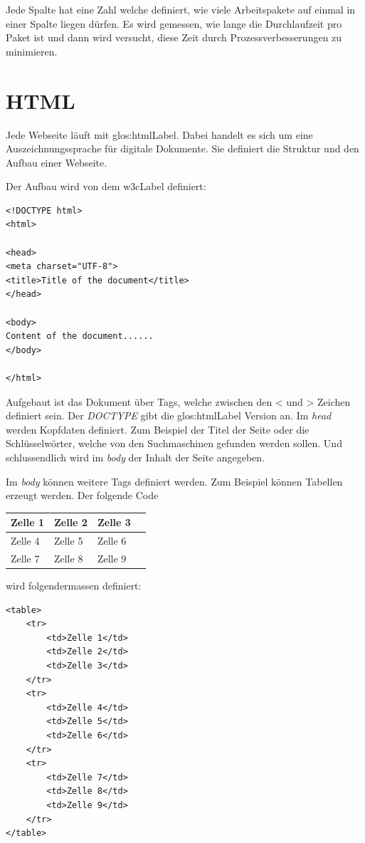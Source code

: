 Jede Spalte hat eine Zahl welche definiert, wie viele Arbeitspakete auf einmal in einer Spalte liegen dürfen. Es wird gemessen, wie lange die Durchlaufzeit pro Paket ist und dann wird versucht, diese Zeit durch Prozessverbesserungen zu minimieren. 


\section{HTML}
Jede Webseite läuft mit \Gls{glos:htmlLabel}. Dabei handelt es sich um eine Auszeichnungssprache für digitale Dokumente. Sie definiert die Struktur und den Aufbau einer Webseite.

Der Aufbau wird von dem \gls{w3cLabel} definiert:
\begin{lstlisting}
<!DOCTYPE html>
<html>

<head>
<meta charset="UTF-8">
<title>Title of the document</title>
</head>

<body>
Content of the document......
</body>

</html> 
\end{lstlisting}

Aufgebaut ist das Dokument über Tags, welche zwischen den < und > Zeichen definiert sein. Der \textit{DOCTYPE} gibt die \Gls{glos:htmlLabel} Version an. Im \textit{head} werden Kopfdaten definiert. Zum Beispiel der Titel der Seite oder die Schlüsselwörter, welche von den Suchmaschinen gefunden werden sollen. Und schlussendlich wird im \textit{body} der Inhalt der Seite angegeben.

Im \textit{body} können weitere Tags definiert werden. Zum Beispiel können Tabellen erzeugt werden. Der folgende Code

\begin{center}
    \begin{tabular}{| l | l | l | l |}
    \hline
	Zelle 1 & Zelle 2 & Zelle 3 \\ \hline
	Zelle 4 & Zelle 5 & Zelle 6 \\ \hline
	Zelle 7 & Zelle 8 & Zelle 9 \\ \hline
    \end{tabular}
\end{center}

wird folgendermassen definiert:

\begin{lstlisting}
<table>
	<tr>
		<td>Zelle 1</td>
		<td>Zelle 2</td>
		<td>Zelle 3</td>
	</tr>
	<tr>
		<td>Zelle 4</td>
		<td>Zelle 5</td>
		<td>Zelle 6</td>
	</tr>
	<tr>
		<td>Zelle 7</td>
		<td>Zelle 8</td>
		<td>Zelle 9</td>
	</tr>
</table>
\end{lstlisting}

